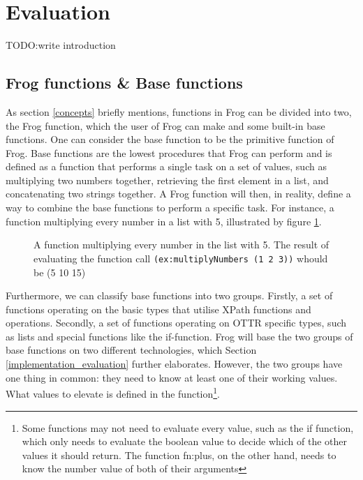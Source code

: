 \section{Evaluation}
\label{evaluation}
TODO:write introduction

\subsection{Frog functions \& Base functions}
As section \ref{concepts} briefly mentions, functions in Frog can be divided into two, the Frog function, which the user of Frog can make and some built-in base functions. One can consider the base function to be the primitive function of Frog. Base functions are the lowest procedures that Frog can perform and is defined as a function that performs a single task on a set of values, such as multiplying two numbers together, retrieving the first element in a list, and concatenating two strings together. A Frog function will then, in reality, define a way to combine the base functions to perform a specific task. For instance, a function multiplying every number in a list with 5, illustrated by figure \ref{fig:list_multiplication}. 

\begin{figure}
    
    \caption{A function multiplying every number in the list with 5. The result of evaluating the function call \lstinline{(ex:multiplyNumbers (1 2 3))} whould be (5 10 15)}
    \label{fig:list_multiplication}
\end{figure}


\para
Furthermore, we can classify base functions into two groups. Firstly, a set of functions operating on the basic types that utilise XPath functions and operations. Secondly, a set of functions operating on OTTR specific types, such as lists and special functions like the if-function. Frog will base the two groups of base functions on two different technologies, which Section \ref{implementation_evaluation} further elaborates. However, the two groups have one thing in common: they need to know at least one of their working values. What values to elevate is defined in the function\footnote{Some functions may not need to evaluate every value, such as the if function, which only needs to evaluate the boolean value to decide which of the other values it should return. The function fn:plus, on the other hand, needs to know the number value of both of their arguments}. 

